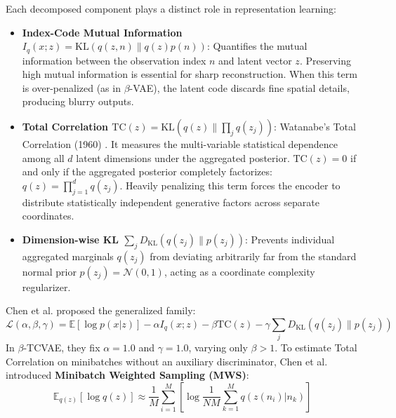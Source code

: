 \documentclass[10pt,journal,compsoc]{IEEEtran}
\begin{document}
Each decomposed component plays a distinct role in representation learning:
\begin{itemize}
    \item \textbf{Index-Code Mutual Information $I_q(x; z) = \text{KL}(q(z, n) \parallel q(z)p(n))$}: Quantifies the mutual information between the observation index $n$ and latent vector $z$. Preserving high mutual information is essential for sharp reconstruction. When this term is over-penalized (as in $\beta$-VAE), the latent code discards fine spatial details, producing blurry outputs.
    \item \textbf{Total Correlation $\text{TC}(z) = \text{KL}(q(z) \parallel \prod_j q(z_j))$}: Watanabe's Total Correlation (1960) \cite{watanabe1960information}. It measures the multi-variable statistical dependence among all $d$ latent dimensions under the aggregated posterior. $\text{TC}(z) = 0$ if and only if the aggregated posterior completely factorizes: $q(z) = \prod_{j=1}^d q(z_j)$. Heavily penalizing this term forces the encoder to distribute statistically independent generative factors across separate coordinates.
    \item \textbf{Dimension-wise KL $\sum_j D_{\text{KL}}(q(z_j) \parallel p(z_j))$}: Prevents individual aggregated marginals $q(z_j)$ from deviating arbitrarily far from the standard normal prior $p(z_j) = \mathcal{N}(0, 1)$, acting as a coordinate complexity regularizer.
\end{itemize}

Chen et al. \cite{chen2018isolating} proposed the generalized family:
\begin{equation}
\mathcal{L}(\alpha, \beta, \gamma) = \mathbb{E}[\log p(x|z)] - \alpha I_q(x; z) - \beta \text{TC}(z) - \gamma \sum_j D_{\text{KL}}(q(z_j) \parallel p(z_j))
\label{eq:beta_tcvae_family}
\end{equation}
In $\beta$-TCVAE, they fix $\alpha = 1.0$ and $\gamma = 1.0$, varying only $\beta > 1$. To estimate Total Correlation on minibatches without an auxiliary discriminator, Chen et al. introduced \textbf{Minibatch Weighted Sampling (MWS)}:
\begin{equation}
\mathbb{E}_{q(z)}[\log q(z)] \approx \frac{1}{M}\sum_{i=1}^M \left[ \log \frac{1}{NM} \sum_{k=1}^M q(z(n_i)|n_k) \right]
\label{eq:mws}
\end{equation}
\end{document}
